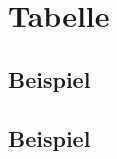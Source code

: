 \documentclass{scrreprt}
\begin{document}
\tableofcontents
\listoftables
\chapter{Tabelle}
\section{Beispiel}
\section{Beispiel}

\iffalse
  \makeatletter
    \renewcommand*\LT@array{%
      \global\let\caption@opt@@longtable\@undefined
      \def\captionsetup{%
        \noalign\bgroup
        \@ifstar\@captionsetup\@captionsetup}%
      \def\@captionsetup##1{\LT@captionsetup{##1}\egroup}%
      \def\LT@captionsetup##1{%
        \captionsetup@startrue\caption@setup@options[@longtable]{##1}%
        \global\let\caption@opt@@longtable\caption@opt@@longtable}%
      \def\@captionabovetrue{\LT@captionsetup{position=t}}%
      \def\@captionabovefalse{\LT@captionsetup{position=b}}%
      \def\captionlistentry{%
        \noalign\bgroup
        \@ifstar\@captionlistentry\@captionlistentry}%
      \def\@captionlistentry##1{\LT@captionlistentry{##1}\egroup}
      \def\LT@captionlistentry##1{%
        \caption@listentry\@firstoftwo[\LTcaptype]{##1}}%
      \def\ContinuedFloat{\noalign{%
        \caption@Error{\noexpand\ContinuedFloat outside float}}}%
      \caption@ORI@LT@array}%
  \makeatother
\fi
\end{document}
